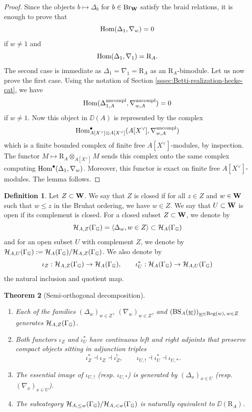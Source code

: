 \documentclass[a4paper, 10pt, oneside, reqno]{amsart}
\theoremstyle{plain}
\newtheorem{thm}{Theorem}[subsection]
\theoremstyle{definition}
\newtheorem{defi}[thm]{Definition}
\theoremstyle{remark}
\newcommand{\Gbb}{\mathbb{G}}
\newcommand{\RR}{\mathrm{R}}
\newcommand{\BS}{\mathrm{BS}}
\newcommand{\uncompl}{\mathrm{uncompl}}
\begin{document}
\begin{proof}
Since the objects $b \mapsto \Delta_{b}$ for $b \in \mathrm{Br}_{\mathbf{W}}$ satisfy the braid relations, it is enough to prove that 
$$\mathrm{Hom}(\Delta_1, \nabla_w) = 0$$
if $w \neq 1$ and 
$$\Hom(\Delta_1, \nabla_1) = \RR_A.$$
The second case is immediate as $\Delta_1 = \nabla_1 = \RR_A$ as an $\RR_{A}$-bimodule. Let us now prove the first case. Using the notation of Section \ref{sssec:Betti-realization-hecke-cat}, we have 
$$\Hom(\Delta_{1,A}^{\uncompl}, \nabla_{w,A}^{\uncompl}) = 0$$
if $w \neq 1$. Now this object in $\DD(A)$ is represented by the complex 
$$\Hom^{\bullet}_{A[X^{\vee}] \otimes A[X^{\vee}]}(A[X^{\vee}], \nabla_{w,A}^{\uncompl})$$ 
which is a finite bounded complex of finite free $A[X^{\vee}]$-modules, by inspection. The functor $M \mapsto \RR_A \otimes_{A[X^{\vee}]} M$ sends this complex onto the same complex computing $\mathrm{Hom}^{\bullet}(\Delta_1, \nabla_w)$. Moreover, this functor is exact on finite free $A[X^{\vee}]$-modules. The lemma follows.  
\end{proof}

\begin{defi}
Let $Z \subset \mathbf{W}$. We say that $Z$ is closed if for all $z \in Z$ and $w \in \mathbf{W}$ such that $w \leq z$ in the Bruhat ordering, we have $w \in Z$. We say that $U \subset \mathbf{W}$ is open if its complement is closed. For a closed subset $Z\subset \mathbf{W}$, we denote by 
$$\Hcal_{A,Z}(\Gamma_{\Gbb}) = \left\langle \Delta_w, w \in Z \right\rangle \subset \Hcal_{A}(\Gamma_{\Gbb})$$
and for an open subset $U$ with complement $Z$, we denote by $\Hcal_{A,U}(\Gamma_{\Gbb}) := \Hcal_{A}(\Gamma_{\Gbb})/\Hcal_{A,Z}(\Gamma_{\Gbb})$. We also denote by 
$$\iota_Z : \Hcal_{A,Z}(\Gamma_{\Gbb}) \to \Hcal_A(\Gamma_{\Gbb}), \qquad \iota_U^* : \Hcal_A(\Gamma_{\Gbb}) \to \Hcal_{A,U}(\Gamma_{\Gbb})$$ 
the natural inclusion and quotient map. 
\end{defi} 

\begin{thm}[Semi-orthogonal decomposition]\label{thm:semi-orthogonal-decomposition-hecke-cat}
\begin{enumerate}
\item Each of the families $(\Delta_w)_{w\in Z}$, $(\nabla_w)_{w\in Z}$, and $(\BS_A(\underline{w}))_{\underline{w}\in\Reg(w),\,w\in Z}$ generates $\Hcal_{A,Z}(\Gamma_{\Gbb})$.
\item Both functors $\iota_Z$ and $\iota_U^*$ have continuous left and right adjoints that preserve compact objects sitting in adjunction triples 
$$\iota_Z^* \dashv \iota_Z \dashv \iota_Z^!, \qquad \iota_{U,!} \dashv \iota_U^* \dashv \iota_{U,*}.$$
\item The essential image of $\iota_{U,!}$ (resp. $\iota_{U,*}$) is generated by $(\Delta_{x})_{x \in U}$ (resp. $(\nabla_x)_{x \in U}$). 
\item The subcategory $\Hcal_{A, \leq w}(\Gamma_{\Gbb})/\Hcal_{A, <w}(\Gamma_{\Gbb})$ is naturally equivalent to $\DD(\RR_A)$. 
\end{enumerate}
\end{thm}
\end{document}
